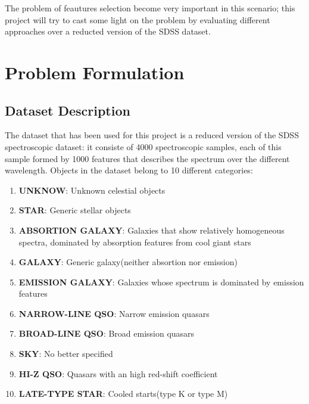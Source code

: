 \documentclass[a4paper,10pt]{article}
\begin{document}
  The problem of feautures selection become very important in this scenario; this project will try to cast
  some light on the problem by evaluating different approaches over a reducted version of the SDSS dataset.
  
\newpage

\section{Problem Formulation}

  \subsection{Dataset Description}
    The dataset that has been used for this project is a reduced version of the SDSS spectroscopic dataset:
    it consiste of 4000 spectroscopic samples, each of this sample formed by 1000 features that describes 
    the spectrum over the different wavelength.\newline
    Objects in the dataset belong to 10 different categories:
    \begin{enumerate}
      \item \textbf{UNKNOW}: Unknown celestial objects
      \item \textbf{STAR}: Generic stellar objects
      \item \textbf{ABSORTION GALAXY}: Galaxies that show relatively homogeneous spectra, dominated by absorption features from cool giant stars
      \item \textbf{GALAXY}: Generic galaxy(neither absortion nor emission)
      \item \textbf{EMISSION GALAXY}: Galaxies whose spectrum is dominated by emission features
      \item \textbf{NARROW-LINE QSO}: Narrow emission quasars
      \item \textbf{BROAD-LINE QSO}: Broad emission quasars
      \item \textbf{SKY}: No better specified
      \item \textbf{HI-Z QSO}: Quasars with an high red-shift coefficient 
      \item \textbf{LATE-TYPE STAR}: Cooled starts(type K or type M)
    \end{enumerate}
  
\end{document}
